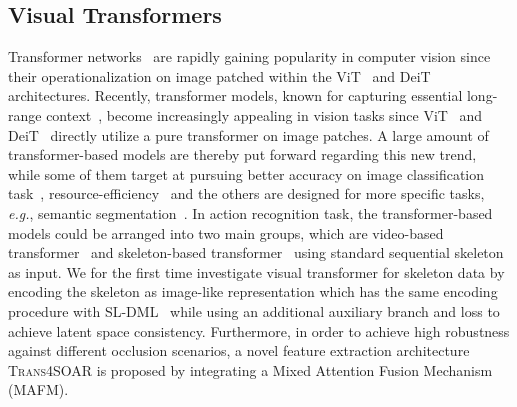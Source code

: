\documentclass[lettersize,journal]{IEEEtran}
\begin{document}
\subsection{Visual Transformers}
Transformer networks~\cite{vaswani2017attention} are rapidly gaining popularity in computer vision since their operationalization on image patched within the ViT~\cite{dosovitskiy2020vit} and DeiT~\cite{touvron2021deit} architectures. 
Recently, transformer models, known for capturing essential long-range context~\cite{vaswani2017attention}, become increasingly appealing in vision tasks since ViT~\cite{dosovitskiy2020vit} and DeiT~\cite{touvron2021deit} directly utilize a pure transformer on image patches.
A large amount of transformer-based models are thereby put forward regarding this new trend, while some of them target at pursuing better accuracy on image classification task~\cite{chu2021twins,liu2021swin,touvron2021cait}, resource-efficiency~\cite{graham2021levit, zhang2021rest} and the others are designed for more specific tasks, \textit{e.g.}, semantic segmentation~\cite{zhang2021trans4trans_iccvw}.
In action recognition task, the transformer-based models could be arranged into two main groups, which are video-based transformer~\cite{arnab2021vivit,li2021groupformer,zhang2021vidtr,peng2022transdarc} and skeleton-based transformer~\cite{bai2021gcst,mazzia2021action,plizzari2021skeleton,plizzari2021spatial,shi2021star,zhang2021stst} using standard sequential skeleton as input.
We for the first time investigate visual transformer for skeleton data by encoding the skeleton as image-like representation which has the same encoding procedure with SL-DML~\cite{memmesheimer2021sl} while using an additional auxiliary branch and loss to achieve latent space consistency.
Furthermore, in order to achieve high robustness against different occlusion scenarios, a novel feature extraction architecture \textsc{Trans4SOAR} is proposed by integrating a Mixed Attention Fusion Mechanism (MAFM).
\end{document}
